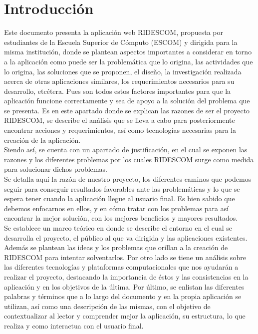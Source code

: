 \chapter{Introducción}
	
	\noindent Este documento presenta la aplicación web RIDESCOM, propuesta por estudiantes de la Escuela Superior de Cómputo (ESCOM) y dirigida para la misma institución, donde se plantean aspectos importantes a considerar en torno a la aplicación como puede ser la problemática que lo origina, las actividades que lo origina, las soluciones que se proponen, el diseño, la investigación realizada acerca de otras aplicaciones similares, los requerimientos necesarios para su desarrollo, etcétera. Pues son todos estos factores importantes para que la aplicación funcione correctamente y sea de apoyo a la solución del problema que se presenta. Es en este apartado donde se explican las razones de ser el proyecto RIDESCOM, se describe el análisis que se lleva a cabo para posteriormente encontrar acciones y requerimientos, así como tecnologías necesarias para la creación de la aplicación. \\
	Siendo así, se cuenta con un apartado de justificación, en el cual se exponen las razones y los diferentes problemas por los cuales RIDESCOM surge como medida para solucionar dichos problemas.\\
	Se detalla aquí la razón de nuestro proyecto, los diferentes caminos que podemos seguir para conseguir resultados favorables ante las problemáticas y lo que se espera tener cuando la aplicación llegue al usuario final. Es bien sabido que debemos enfocarnos en ellos, y en cómo tratar con los problemas para así encontrar la mejor solución, con los mejores beneficios y mayores resultados.\\
	Se establece un marco teórico en donde se describe el entorno en el cual se desarrolla el proyecto, el público al que va dirigida y las aplicaciones existentes.\\
	Además se plantean las ideas y los problemas que orillan a la creación de RIDESCOM para intentar solventarlos. Por otro lado se tiene un análisis sobre las diferentes tecnologías y plataformas computacionales que nos ayudarán a realizar el proyecto, destacando la importancia de éstos y las consistencias en la aplicación y en los objetivos de la última. Por último, se enlistan las diferentes palabras y términos que a lo largo del documento y en la propia aplicación se utilizan, así como una descripción de las mismas, con el objetivo de contextualizar al lector y comprender mejor la aplicación, su estructura, lo que  realiza y como interactua con el usuario final.\\
